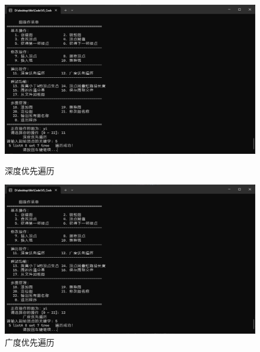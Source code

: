 \documentclass[supercite]{Experimental_Report}
\theoremstyle{definition}
\begin{document}
\begin{figure}[htb]
	\begin{center}
		\includegraphics[scale=0.30]{images/2-10.jpg}
		\caption{深度优先遍历}
		\label{fig2-10}
	\end{center}


	\begin{center}
		\includegraphics[scale=0.30]{images/2-11.jpg}
		\caption{广度优先遍历}
		\label{fig2-11}
	\end{center}
\end{figure}
\end{document}
